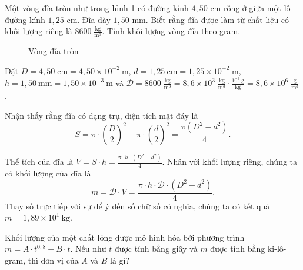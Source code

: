 \documentclass[a4paper, titlepage, openany]{book}
\newcounter{exercise}
\newcounter{solution}
\begin{document}
\exercise Một vòng đĩa tròn như trong hình \ref{fig:vong_dia} có đường kính $4{,}50$ cm rỗng ở giữa một lỗ đường kính $1{,}25$ cm. Đĩa dày $1{,}50$ mm. Biết rằng đĩa được làm từ chất liệu có khối lượng riêng là $8600\;\frac{\text{kg}}{\text{m}^3}$. Tính khôi lượng vòng đĩa theo gram.

\begin{figure}
   \centering
   \caption{Vòng đĩa tròn}
   \label{fig:vong_dia}
\end{figure}

\solution

Đặt $D=4{,}50\;\text{cm}=4{,}50\times 10^{-2}\ \text{m}$, $d=1{,}25\ \text{cm}=1{,}25\times 10^{-2}\;\text{m}$, $h=1{,}50\ \text{mm}=1{,}50\times 10^{-3}\ \text{m}$ và $\mathcal{D}=8600\;\frac{\text{kg}}{\text{m}^3}=8{,}6\times 10^3\;\frac{\text{kg}}{\text{m}^3}\cdot \frac{10^3\;\text{g}}{\text{kg}}=8{,}6\times 10^6\;\frac{\text{g}}{\text{m}^3}$.

Nhận thấy rằng đĩa có dạng trụ, diện tích mặt đáy là $$S=\pi\cdot \left(\frac{D}{2}\right)^2-\pi\cdot \left(\frac{d}{2}\right)^2=\frac{\pi \left(D^2-d^2\right)}{4}.$$

Thể tích của đĩa là $V=S\cdot h=\frac{\pi \cdot h\cdot \left(D^2-d^2\right)}{4}.$ Nhân với khối lượng riêng, chúng ta có khối lượng của đĩa là $$m=\mathcal{D}\cdot V=\frac{\pi \cdot h\cdot \mathcal{D}\cdot \left(D^2-d^2\right)}{4}.$$ Thay số trực tiếp với sự để ý đến số chữ số có nghĩa, chúng ta có kết quả $m=\boxed{1{,}89\times 10^1\ \text{kg}}$.

\exercise Khối lượng của một chất lỏng được mô hình hóa bởi phương trình $m=A\cdot t^{0{,}8}-B\cdot t$. Nếu như $t$ được tính bằng giây và $m$ được tính bằng ki-lô-gram, thì đơn vị của $A$ và $B$ là gì?
\end{document}
